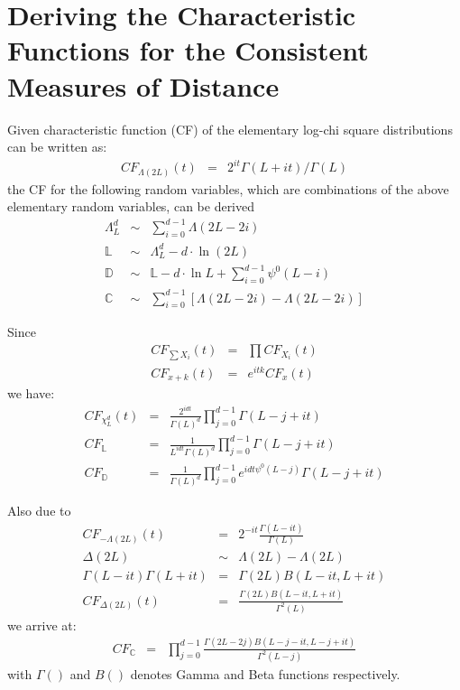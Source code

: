 \section{Deriving the Characteristic Functions for the Consistent Measures of Distance}

Given characteristic function (CF) of the elementary log-chi square distributions can be written as:
\begin{eqnarray}
 CF_{\Lambda(2L)}(t) &=& 2^{it}\Gamma(L+it)/\Gamma(L) \nonumber
\end{eqnarray}
  the CF for the following random variables,
  which are combinations of the above elementary random variables, can be derived
\begin{eqnarray*}
   \Lambda^d_L &\sim&  \sum^{d-1}_{i=0} \Lambda(2L-2i) \\
  \mathbb{L} &\sim&  \Lambda^d_L -d \cdot \ln(2L) \\
  \mathbb{D} &\sim& \mathbb{L} - d \cdot \ln{L} + \sum^{d-1}_{i=0} \psi^0(L-i) \\
  \mathbb{C} &\sim&  \sum^{d-1}_{i=0} \left[ \Lambda(2L-2i) - \Lambda(2L-2i) \right]
\end{eqnarray*}

Since
\begin{eqnarray*}
 CF_{\sum X_i}(t)   &=& \prod CF_{X_i}(t) \\
 CF_{x+k}(t) &=& e^{itk}CF_x(t)
\end{eqnarray*}
we have:
\begin{eqnarray}
  CF_{\chi^d_L}(t) &=& \frac{2^{idt}}{\Gamma(L)^d} \prod^{d-1}_{j=0} \Gamma(L-j+it) \\
   CF_{\mathbb{L}} &=& \frac{1}{L^{idt} \Gamma(L)^d}  \prod^{d-1}_{j=0} \Gamma(L-j+it) \\
   CF_{\mathbb{D}} &=& \frac{ 1 }{\Gamma(L)^d} \prod^{d-1}_{j=0} e^{idt \psi^0(L-j)} \Gamma(L-j+it)  
\end{eqnarray}

Also due to
\begin{eqnarray*}
  CF_{-\Lambda(2L)}(t) &=& 2^{-it}\frac{\Gamma(L-it)}{\Gamma(L)} \\ 
  \Delta(2L) &\sim& \Lambda(2L) - \Lambda(2L) \\
  \Gamma(L-it) \Gamma(L+it) &=&  \Gamma(2L)B(L-it,L+it) \\
   CF_{\Delta(2L)}(t) &=& \frac{\Gamma(2L)B(L-it,L+it)}{\Gamma^2(L)} 
\end{eqnarray*}
we arrive at:
\begin{eqnarray}
  CF_{\mathbb{C}} &=&  \prod^{d-1}_{j=0} \frac{\Gamma(2L-2j)B(L-j-it,L-j+it)}{\Gamma^2(L-j)} 
\end{eqnarray}
with $\Gamma()$ and $B()$ denotes Gamma and Beta functions respectively.

